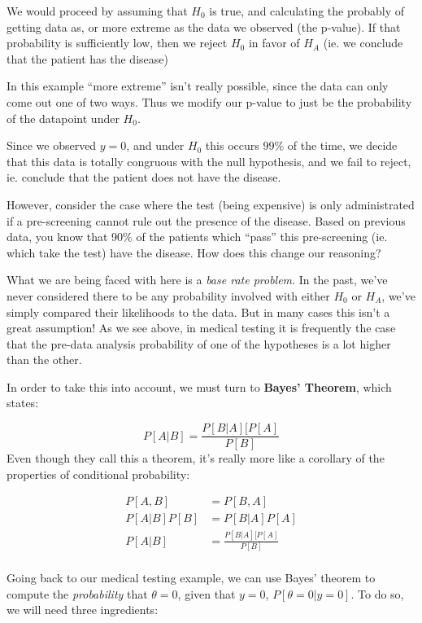 \documentclass[
]{article}
\begin{document}
We would proceed by assuming that \(H_0\) is true, and calculating the
probably of getting data as, or more extreme as the data we observed
(the p-value). If that probability is sufficiently low, then we reject
\(H_0\) in favor of \(H_A\) (ie. we conclude that the patient has the
disease)

In this example ``more extreme'' isn't really possible, since the data
can only come out one of two ways. Thus we modify our p-value to just be
the probability of the datapoint under \(H_0\).

Since we observed \(y=0\), and under \(H_0\) this occurs \(99\%\) of the
time, we decide that this data is totally congruous with the null
hypothesis, and we fail to reject, ie. conclude that the patient does
not have the disease.

However, consider the case where the test (being expensive) is only
administrated if a pre-screening cannot rule out the presence of the
disease. Based on previous data, you know that 90\% of the patients
which ``pass'' this pre-screening (ie. which take the test) have the
disease. How does this change our reasoning?

What we are being faced with here is a \emph{base rate problem}. In the
past, we've never considered there to be any probability involved with
either \(H_0\) or \(H_A\), we've simply compared their likelihoods to
the data. But in many cases this isn't a great assumption! As we see
above, in medical testing it is frequently the case that the pre-data
analysis probability of one of the hypotheses is a lot higher than the
other.

In order to take this into account, we must turn to \textbf{Bayes'
Theorem}, which states:

\[
P[A|B] = \frac{P[B|A][P[A]}{P[B]}
\] Even though they call this a theorem, it's really more like a
corollary of the properties of conditional probability:

\[
\begin{split}
P[A,B] &= P[B,A]\\
P[A|B] P[B] &= P[B|A]P[A]\\
P[A|B] &= \frac{P[B|A][P[A]}{P[B]}\\
\end{split}
\]

Going back to our medical testing example, we can use Bayes' theorem to
compute the \emph{probability} that \(\theta=0\), given that \(y=0\),
\(P[\theta=0|y=0]\). To do so, we will need three ingredients:
\end{document}
